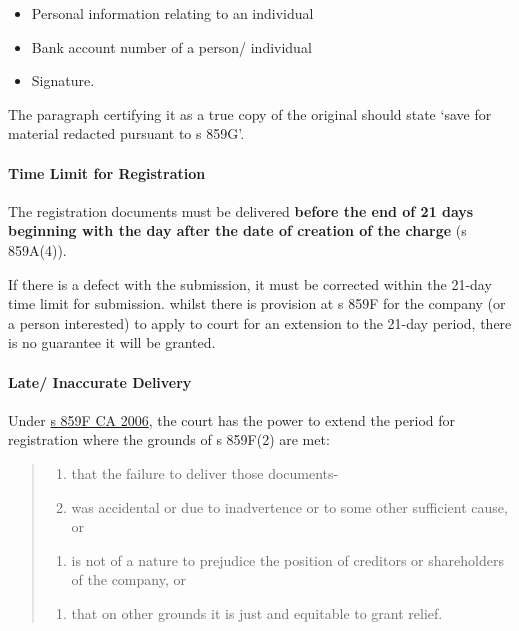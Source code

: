 \documentclass[
]{article}
\providecommand{\tightlist}{%
  \setlength{\itemsep}{0pt}\setlength{\parskip}{0pt}}
\begin{document}
\begin{itemize}
\tightlist
\item
  Personal information relating to an individual
\item
  Bank account number of a person/ individual
\item
  Signature.
\end{itemize}

The paragraph certifying it as a true copy of the original should state
`save for material redacted pursuant to s 859G'.

\hypertarget{time-limit-for-registration}{%
\paragraph{Time Limit for
Registration}\label{time-limit-for-registration}}

The registration documents must be delivered \textbf{before the end of
21 days beginning with the day after the date of creation of the charge}
(s 859A(4)).

If there is a defect with the submission, it must be corrected within
the 21-day time limit for submission. whilst there is provision at s
859F for the company (or a person interested) to apply to court for an
extension to the 21-day period, there is no guarantee it will be
granted.

\hypertarget{late-inaccurate-delivery}{%
\paragraph{Late/ Inaccurate Delivery}\label{late-inaccurate-delivery}}

Under \href{https://www.legislation.gov.uk/ukpga/2006/46/section/859F}{s
859F CA 2006}, the court has the power to extend the period for
registration where the grounds of s 859F(2) are met:

\begin{quote}
\begin{enumerate}
\def\labelenumi{(\alph{enumi})}
\tightlist
\item
  that the failure to deliver those documents-\\
\item
  was accidental or due to inadvertence or to some other sufficient
  cause, or\\
\end{enumerate}

\begin{enumerate}
\def\labelenumi{(\roman{enumi})}
\setcounter{enumi}{1}
\tightlist
\item
  is not of a nature to prejudice the position of creditors or
  shareholders of the company, or\\
\end{enumerate}

\begin{enumerate}
\def\labelenumi{(\alph{enumi})}
\setcounter{enumi}{1}
\tightlist
\item
  that on other grounds it is just and equitable to grant relief.
\end{enumerate}
\end{quote}
\end{document}
